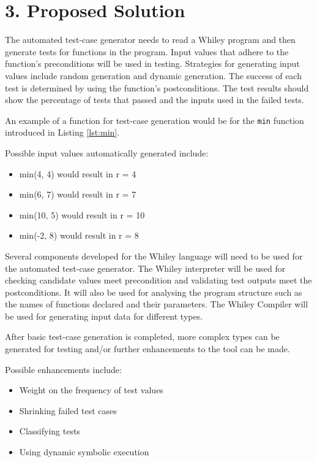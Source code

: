 \documentclass[11pt, a4paper, oneside, openright]{report}
\begin{document}
\section*{3. Proposed Solution}

The automated test-case generator needs to read a Whiley program and then generate tests for functions in the program. 
Input values that adhere to the function's preconditions will be used in testing. Strategies for generating input values include random generation and dynamic generation.
The success of each test is determined by using the function's postconditions. 
The test results should show the percentage of tests that passed and the inputs used in the failed tests.

An example of a function for test-case generation would be for the \texttt{min} function introduced in Listing \ref{lst:min}. 

Possible input values automatically generated include:
\begin{itemize}
	\item min(4, 4) would result in r = 4
	\item min(6, 7) would result in r = 7
	\item min(10, 5) would result in r = 10
	\item min(-2, 8) would result in r = 8
\end{itemize}

Several components developed for the Whiley language will need to be used for the automated test-case generator. 
The Whiley interpreter will be used for checking candidate values meet precondition and validating test outputs meet the postconditions. It will also be used for analysing the program structure such as the names of functions declared and their parameters. 
The Whiley Compiler will be used for generating input data for different types.

After basic test-case generation is completed, more complex types can be generated for testing and/or further enhancements to the tool can be made. 

Possible enhancements include:
\begin{itemize}
	\item Weight on the frequency of test values
	\item Shrinking failed test cases
	\item Classifying tests
	\item Using dynamic symbolic execution
\end{itemize} 
\end{document}
